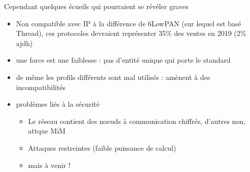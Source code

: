\documentclass{beamer}
\begin{document}
  \begin{frame}
    \begin{block}{Cependant quelques écueils qui pourraient se révéler graves}
      \begin {itemize}
	\item Non compatible avec IP à la différence de 6LowPAN (sur lequel est basé Thread), ces protocoles devraient représenter 35\% des ventes en 2019 (2\% ajdh)
	\item une force est une faiblesse : pas d'entité unique qui porte le standard 
	\item de même les profils différents sont mal utilisés : amènent à des incompatibilités
	\item problèmes liés à la sécurité
	\begin{itemize}
	  \item Le réseau contient des noeuds à communication chiffrés, d'autres non, attque MiM
	  \item Attaques restreintes (faible puissance de calcul)
	  \item mais à venir !
	\end{itemize}
      \end{itemize}
    \end{block}
  \end{frame}

  
\end{document}
